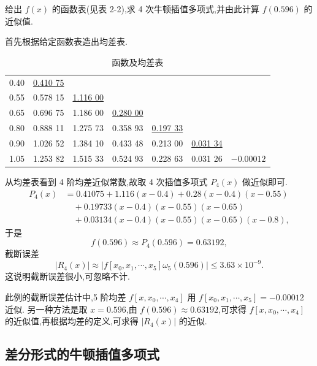 \documentclass[../../main.tex]{subfiles}%
\begin{document}
\begin{example}
给出 $f(x)$ 的函数表(见表 2-2),求 4 次牛顿插值多项式,并由此计算 $f(0.596)$ 的近似值.
\end{example}
\begin{solution}
首先根据给定函数表造出均差表.
\begin{table}[H]
\centering
\caption{函数及均差表}
\label{table:例题1均差表}
\begin{tabular}{c|c|c|c|c|c|c}
\hline
0.40  & \underline{0.410 75} &          &          &          &          &          \\
0.55  & 0.578 15          & \underline{1.116 00} &          &          &          &          \\
0.65  & 0.696 75          & 1.186 00          & \underline{0.280 00} &          &          &          \\
0.80  & 0.888 11          & 1.275 73          & 0.358 93          & \underline{0.197 33} &          &          \\
0.90  & 1.026 52          & 1.384 10          & 0.433 48          & 0.213 00          & \underline{0.031 34} &          \\
1.05  & 1.253 82          & 1.515 33          & 0.524 93          & 0.228 63          & 0.031 26          & $-0.000 12$ \\
\hline
\end{tabular}
\end{table}
从均差表看到 4 阶均差近似常数,故取 4 次插值多项式 $P_4(x)$ 做近似即可.
\begin{align*}
P_4(x) &= 0.41075 + 1.116(x - 0.4) + 0.28(x - 0.4)(x - 0.55) \\
&\quad + 0.19733(x - 0.4)(x - 0.55)(x - 0.65) \\
&\quad + 0.03134(x - 0.4)(x - 0.55)(x - 0.65)(x - 0.8),
\end{align*}
于是
\[
f(0.596) \approx P_4(0.596) = 0.63192,
\]
截断误差
\[
|R_4(x)| \approx |f[x_0, x_1, \cdots, x_5]\omega_5(0.596)| \leqslant 3.63 \times 10^{-9}.
\]
这说明截断误差很小,可忽略不计.

此例的截断误差估计中,5 阶均差 $f[x, x_0, \cdots, x_4]$ 用 $f[x_0, x_1, \cdots, x_5] = -0.00012$ 近似. 另一种方法是取 $x = 0.596$,由 $f(0.596) \approx 0.63192$,可求得 $f[x, x_0, \cdots, x_4]$ 的近似值,再根据均差的定义,可求得 $|R_4(x)|$ 的近似.

\end{solution}


\subsection{差分形式的牛顿插值多项式}
\end{document}
